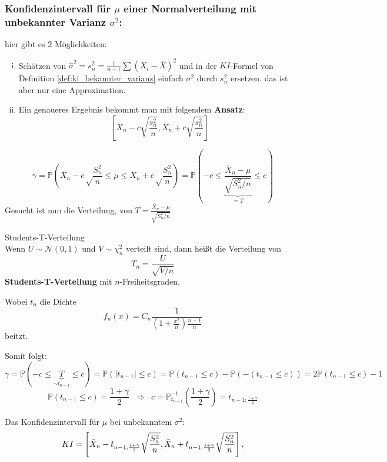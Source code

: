 \subsubsection{Konfidenzintervall für $\mu$ einer Normalverteilung mit unbekannter Varianz $\sigma^2$:}\label{sec:ki_mu_unbekanntes_sigma}
hier gibt es 2 Möglichkeiten:
\begin{enumerate}[i)]
    \item Schätzen von $\hat\sigma^2=s_n^2=\frac{1}{n-1}\sum(X_i-\overline X)^2$
    und in der $KI$-Formel von Definition \ref{def:ki_bekannter_varianz} einfach $\sigma^2$ durch $s_n^2$ ersetzen.
    das ist aber nur eine Approximation.
    \item Ein genaueres Ergebnis bekommt man mit folgendem \textbf{Ansatz}:
        \[\left[\overline X_n-c\sqrt{\frac{s_n^2}{n}}, \overline X_n+c\sqrt{\frac{s_n^2}{n}}\right]\]
\end{enumerate}
\[\gamma=\mathbb{P}\left(\overline X_n-c\sqrt\frac{S_n^2}{n}\leq \mu\leq \overline X_n+c\sqrt\frac{S_n^2}{n}\right)=
\mathbb{P}\left(-c\leq\underbrace{\frac{\overline X_n-\mu}{\sqrt{S_n^2/n}}}_{=T}\leq c\right)\]
Gesucht ist nun die Verteilung, von $T=\frac{\overline X_n-\mu}{\sqrt{S_n^2/n}}$

\begin{definition} Students-T-Verteilung\\
Wenn $U\sim\mathcal{N}(0,1)$ und $V\sim\chi_n^2$ verteilt sind, dann heißt die Verteilung von 
\[T_n=\frac{U}{\sqrt{V/n}}\] 
\textbf{Students-T-Verteilung} mit $n$-Freiheitsgraden.

Wobei $t_n$ die Dichte
\[f_n(x)=C_n\frac{1}{\left(1+\frac{x^2}{n}\right)\frac{n+1}{n}}\]
beitzt.
\end{definition}

Somit folgt:
\[\gamma=\mathbb{P}(-c\leq \underbrace{T}_{\sim t_{n-1}}\leq c)=
\mathbb{P}(|t_{n-1}|\leq c)=\mathbb{P}(t_{n-1}\leq c)-\mathbb{P}(-(t_{n-1}\leq c))=2\mathbb{P}(t_{n-1}\leq c)-1\]
\[\mathbb{P}(t_{n-1}\leq c)=\frac{1+\gamma}{2}\;\;\Rightarrow\;\;c=\mathbb{P}^{-1}_{t_{n-1}}(\frac{1+\gamma}{2})=t_{n-1;\frac{1+\gamma}{2}}\]
\begin{definition}
\label{def:ki_unbekannter_varianz}
Das Konfidenzintervall für $\mu$ bei unbekanntem $\sigma^2$:
\[KI=\left[\bar X_n-t_{n-1;{1+\gamma\over 2}}\sqrt{S_n^2\over n},
\bar X_n+t_{n-1;{1+\gamma\over 2}}\sqrt{S_n^2\over n}\right],\]
\end{definition}

